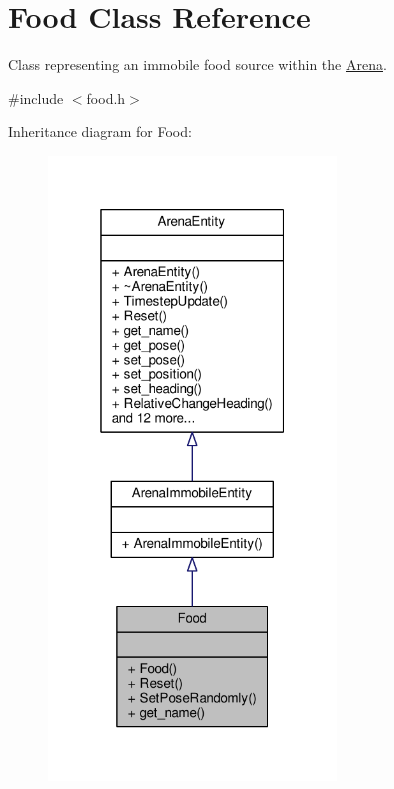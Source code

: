 \hypertarget{classFood}{}\section{Food Class Reference}
\label{classFood}


Class representing an immobile food source within the \hyperlink{classArena}{Arena}.  




{\ttfamily \#include $<$food.\+h$>$}



Inheritance diagram for Food\+:\nopagebreak
\begin{figure}[H]
\begin{center}
\leavevmode
\includegraphics[width=217pt]{classFood__inherit__graph}
\end{center}
\end{figure}


